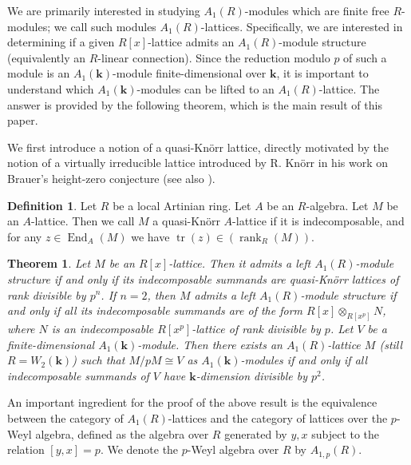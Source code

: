 \documentclass[12pt,letterpaper]{amsart}
\theoremstyle{plain}
\newtheorem{theorem}{Theorem}[section]
\theoremstyle{definition}
\newtheorem{defin}{Definition}[section]
\DeclareMathOperator{\tr}{tr}
\DeclareMathOperator{\End}{End}
\DeclareMathOperator{\rank}{rank}
\begin{document}
We are primarily interested in studying $A_1(R)$-modules which are finite free $R$-modules; we call such modules
$A_1(R)$-lattices.  Specifically, we are interested in determining if
a given $R[x]$-lattice admits an $A_1(R)$-module structure (equivalently an $R$-linear connection).
 Since the reduction modulo $p$ of such a module is an $A_1(\mathbf{k})$-module finite-dimensional over $\mathbf{k}$, 
it is important to understand which $A_1(\mathbf{k})$-modules
can be lifted to an $A_1(R)$-lattice. The answer is provided by the following theorem, which is the main result of this paper.



We first introduce a notion of a quasi-Kn\"{o}rr lattice, directly motivated by
the notion of a virtually irreducible lattice introduced by R. Kn\"{o}rr  in his work on Brauer's height-zero conjecture \cite{K} (see also \cite{G}).


\begin{defin}
Let $R$ be a local Artinian ring. Let $A$ be an $R$-algebra. Let $M$ be an $A$-lattice. 
Then we call $M$ a quasi-Kn\"{o}rr $A$-lattice if it is indecomposable,
and for any $z\in \End_A(M)$  we have   $\tr(z)\in (\rank_{R}(M))$. 
    
\end{defin}








\begin{theorem}\label{Main-Weyl}
 Let $M$ be an $R[x]$-lattice. Then it admits a left $A_1(R)$-module structure if and only if its indecomposable summands are quasi-Kn\"{o}rr
 lattices of rank divisible by $p^n$. If $n=2$,  then $M$ admits a left $A_{1}(R)$-module structure if and only if all its indecomposable summands
 are of the form $R[x]\otimes_{R[x^p]}N$,  where $N$ is an indecomposable $R[x^p]$-lattice of rank divisible by $p$. 
 Let $V$ be a finite-dimensional $A_1(\mathbf{k})$-module. Then there exists an $A_{1}(R)$-lattice $M$ (still $R=W_2(\mathbf{k})$) such that $M/pM\cong V$ as
 $A_1(\mathbf{k})$-modules if and only if all indecomposable summands of $V$ have $\mathbf{k}$-dimension divisible by $p^2$. 

    
\end{theorem}

An important ingredient for the proof of the above result is the equivalence between the category of $A_1(R)$-lattices and the category
of lattices over the $p$-Weyl algebra, defined as the algebra over $R$ generated by $y,x$ subject to the relation $[y,x]=p$.
We denote the $p$-Weyl algebra over $R$ by $A_{1,p}(R)$.  
\end{document}
